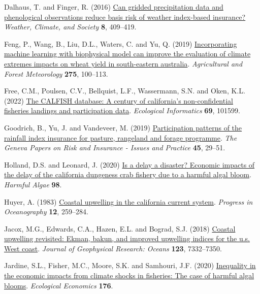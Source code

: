 \documentclass[
  letterpaper,
  DIV=11,
  numbers=noendperiod]{scrartcl}
\newlength{\cslhangindent}
\newlength{\cslentryspacingunit} %
\newenvironment{CSLReferences}[2] %
 {%
  \setlength{\parindent}{0pt}
  \ifodd #1
  \let\oldpar\par
  \def\par{\hangindent=\cslhangindent\oldpar}
  \fi
  \setlength{\parskip}{#2\cslentryspacingunit}
 }%
 {}
\begin{document}
\begin{CSLReferences}{1}{0}
\leavevmode{}%
Dalhaus, T. and Finger, R. (2016)
\href{https://doi.org/10.1175/WCAS-D-16-0020.1}{Can gridded
precipitation data and phenological observations reduce basis risk of
weather index-based insurance?} \emph{Weather, Climate, and Society}
\textbf{8}, 409--419.

\leavevmode{}%
Feng, P., Wang, B., Liu, D.L., Waters, C. and Yu, Q. (2019)
\href{https://doi.org/10.1016/j.agrformet.2019.05.018}{Incorporating
machine learning with biophysical model can improve the evaluation of
climate extremes impacts on wheat yield in south-eastern australia}.
\emph{Agricultural and Forest Meteorology} \textbf{275}, 100--113.

\leavevmode{}%
Free, C.M., Poulsen, C.V., Bellquist, L.F., Wassermann, S.N. and Oken,
K.L. (2022) \href{https://doi.org/10.1016/j.ecoinf.2022.101599}{The
CALFISH database: A century of california's non-confidential fisheries
landings and participation data}. \emph{Ecological Informatics}
\textbf{69}, 101599.

\leavevmode{}%
Goodrich, B., Yu, J. and Vandeveer, M. (2019)
\href{https://doi.org/10.1057/s41288-019-00149-3}{Participation patterns
of the rainfall index insurance for pasture, rangeland and forage
programme}. \emph{The Geneva Papers on Risk and Insurance - Issues and
Practice} \textbf{45}, 29--51.

\leavevmode{}%
Holland, D.S. and Leonard, J. (2020)
\href{https://doi.org/10.1016/j.hal.2020.101904}{Is a delay a disaster?
Economic impacts of the delay of the california dungeness crab fishery
due to a harmful algal bloom}. \emph{Harmful Algae} \textbf{98}.

\leavevmode{}%
Huyer, A. (1983)
\href{https://doi.org/10.1016/0079-6611(83)90010-1}{Coastal upwelling in
the california current system}. \emph{Progress in Oceanography}
\textbf{12}, 259--284.

\leavevmode{}%
Jacox, M.G., Edwards, C.A., Hazen, E.L. and Bograd, S.J. (2018)
\href{https://doi.org/10.1029/2018JC014187}{Coastal upwelling revisited:
Ekman, bakun, and improved upwelling indices for the u.s. West coast}.
\emph{Journal of Geophysical Research: Oceans} \textbf{123}, 7332--7350.

\leavevmode{}%
Jardine, S.L., Fisher, M.C., Moore, S.K. and Samhouri, J.F. (2020)
\href{https://doi.org/10.1016/j.ecolecon.2020.106691}{Inequality in the
economic impacts from climate shocks in fisheries: The case of harmful
algal blooms}. \emph{Ecological Economics} \textbf{176}.


\end{CSLReferences}
\end{document}
